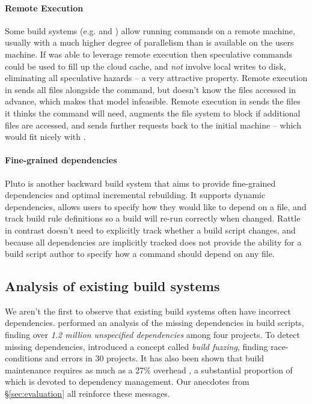 \paragraph{Remote Execution} Some build systems (e.g. \Bazel and \BuildXL \cite{buildxl}) allow running commands on a remote machine, usually with a much higher degree of parallelism than is available on the users machine. If \Rattle was able to leverage remote execution then speculative commands could be used to fill up the cloud cache, and \emph{not} involve local writes to disk, eliminating all speculative hazards -- a very attractive property. Remote execution in \Bazel sends all files alongside the command, but \Rattle doesn't know the files accessed in advance, which makes that model infeasible. Remote execution in \BuildXL sends the files it thinks the command will need, augments the file system to block if additional files are accessed, and sends further requests back to the initial machine -- which would fit nicely with \Rattle.

\paragraph{Fine-grained dependencies} Pluto \cite{erdweg2015sound} is another backward build system that aims to
provide fine-grained dependencies and optimal incremental rebuilding.  It supports dynamic
dependencies, allows users to specify how they would like to depend on a file, and track build
rule definitions so a build will re-run correctly when changed.  Rattle in contrast doesn't need
to explicitly track whether a build script changes, and because all dependencies are implicitly
tracked \Rattle does not provide the ability for a build script author to specify how a command
should depend on any file.

\subsection{Analysis of existing build systems}

We aren't the first to observe that existing build systems often have incorrect dependencies.  \citet{bezemer2017empirical} performed an analysis of the missing dependencies in \Make build scripts, finding over \emph{1.2 million unspecified dependencies} among four projects. To detect missing dependencies, \citet{detecting_incorrect_build_rules} introduced a concept called \emph{build fuzzing}, finding race-conditions and errors in 30 projects. It has also been shown that build maintenance requires as much as a 27\% overhead \cite{build_maintenance}, a substantial proportion of which is devoted to dependency management. Our anecdotes from \S\ref{sec:evaluation} all reinforce these messages.

